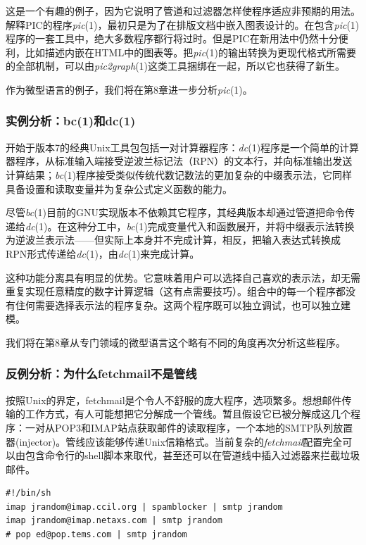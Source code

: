 \documentclass[12pt,oneside]{book}
\begin{document}
这是一个有趣的例子，因为它说明了管道和过滤器怎样使程序适应非预期的用法。解释PIC的程序\textit{pic}(1)，最初只是为了在排版文档中嵌入图表设计的。在包含\textit{pic}(1)程序的一套工具中，绝大多数程序都行将过时。但是PIC在新用法中仍然十分便利，比如描述内嵌在HTML中的图表等。把\textit{pic}(1)的输出转换为更现代格式所需要的全部机制，可以由\textit{pic2graph}(1)这类工具捆绑在一起，所以它也获得了新生。

作为微型语言的例子，我们将在第8章进一步分析\textit{pic}(1)。

\subsubsection{实例分析：bc(1)和dc(1)}
开始于版本7的经典Unix工具包包括一对计算器程序：\textit{dc}(1)程序是一个简单的计算器程序，从标准输入端接受逆波兰标记法（RPN）的文本行，并向标准输出发送计算结果；\textit{bc}(1)程序接受类似传统代数记数法的更加复杂的中缀表示法，它同样具备设置和读取变量并为复杂公式定义函数的能力。

尽管\textit{bc}(1)目前的GNU实现版本不依赖其它程序，其经典版本却通过管道把命令传递给\textit{dc}(1)。在这种分工中，\textit{bc}(1)完成变量代入和函数展开，并将中缀表示法转换为逆波兰表示法——但实际上本身并不完成计算，相反，把输入表达式转换成RPN形式传递给\textit{dc}(1)，由\textit{dc}(1)来完成计算。

这种功能分离具有明显的优势。它意味着用户可以选择自己喜欢的表示法，却无需重复实现任意精度的数字计算逻辑（这有点需要技巧）。组合中的每一个程序都没有住何需要选择表示法的程序复杂。这两个程序既可以独立调试，也可以独立建模。

我们将在第8章从专门领域的微型语言这个略有不同的角度再次分析这些程序。


\subsubsection{反例分析：为什么fetchmail不是管线}
按照Unix的界定，fetchmail是个令人不舒服的庞大程序，选项繁多。想想邮件传输的工作方式，有人可能想把它分解成一个管线。暂且假设它已被分解成这几个程序：一对从POP3和IMAP站点获取邮件的读取程序，一个本地的SMTP队列放置器(injector)。管线应该能够传递Unix信箱格式。当前复杂的\textit{fetchmail}配置完全可以由包含命令行的shell脚本来取代，甚至还可以在管道线中插入过滤器来拦截垃圾邮件。

\begin{Verbatim}
#!/bin/sh
imap jrandom@imap.ccil.org | spamblocker | smtp jrandom
imap jrandom@imap.netaxs.com | smtp jrandom
# pop ed@pop.tems.com | smtp jrandom
\end{Verbatim}
\end{document}
